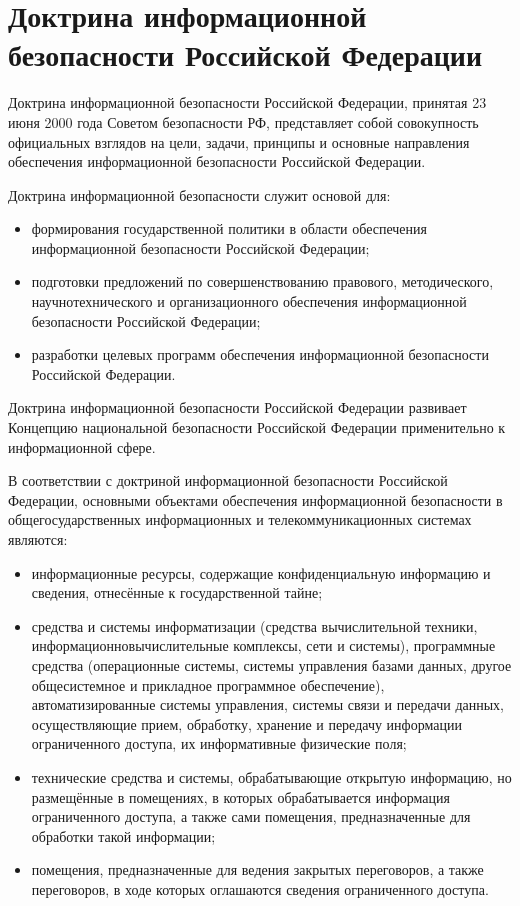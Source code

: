 \section{Доктрина информационной безопасности Российской Федерации} \label{rights_doctrine}

Доктрина информационной безопасности Российской Федерации, принятая 23 июня 2000 года Советом безопасности РФ, представляет собой совокупность официальных взглядов на цели, задачи, принципы и основные направления обеспечения информационной безопасности Российской Федерации.

\vspace{\baselineskip}
Доктрина информационной безопасности служит основой для:
\begin{itemize}
	\item формирования государственной политики в области обеспечения информационной безопасности Российской Федерации; 
	\item подготовки предложений по совершенствованию правового, методического, научно\ndash технического и организационного обеспечения информационной безопасности Российской Федерации; 
	\item разработки целевых программ обеспечения информационной безопасности Российской Федерации. 
\end{itemize}

Доктрина информационной безопасности Российской Федерации развивает Концепцию национальной безопасности Российской Федерации применительно к информационной сфере.

\vspace{\baselineskip}
В соответствии с доктриной информационной безопасности Российской Федерации, основными объектами обеспечения информационной безопасности в общегосударственных информационных и телекоммуникационных системах являются:
\begin{itemize}
	\item информационные ресурсы, содержащие конфиденциальную информацию и сведения, отнесённые к государственной тайне;
	\item средства и системы информатизации (средства вычислительной техники, информационно\ndash вычислительные комплексы, сети и системы), программные средства (операционные системы, системы управления базами данных, другое общесистемное и прикладное программное обеспечение), автоматизированные системы управления, системы связи и передачи данных, осуществляющие прием, обработку, хранение и передачу информации ограниченного доступа, их информативные физические поля;
	\item технические средства и системы, обрабатывающие открытую информацию, но размещённые в помещениях, в которых обрабатывается информация ограниченного доступа, а также сами помещения, предназначенные для обработки такой информации;
	\item помещения, предназначенные для ведения закрытых переговоров, а также переговоров, в ходе которых оглашаются сведения ограниченного доступа.
\end{itemize}

